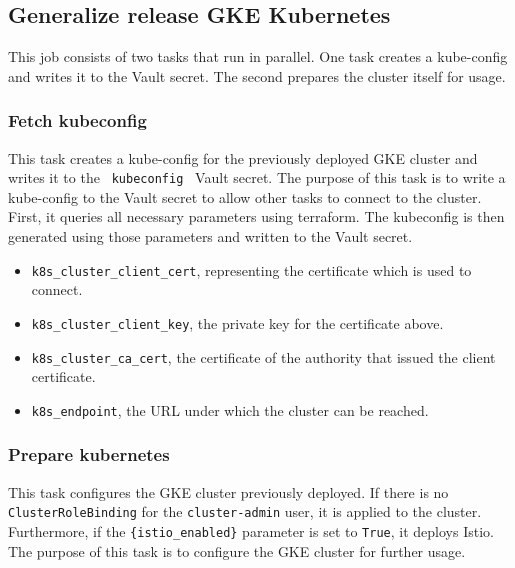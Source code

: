 \subsection{Generalize release GKE Kubernetes}\label{subsec:generalize-release-gke-kubernetes}

This job consists of two tasks that run in parallel.
One task creates a kube-config and writes it to the Vault secret.
The second prepares the cluster itself for usage.

\subsubsection{Fetch kubeconfig}\label{subsubsec:fetch-kubeconfig}

This task creates a kube-config for the previously deployed GKE cluster and writes it to the \verb| kubeconfig | Vault secret.
The purpose of this task is to write a kube-config to the Vault secret to allow other tasks to connect to the cluster.
First, it queries all necessary parameters using terraform.
The kubeconfig is then generated using those parameters and written to the Vault secret.

\begin{itemize}
    \item \verb|k8s_cluster_client_cert|, representing the certificate which is used to connect.
    \item \verb|k8s_cluster_client_key|, the private key for the certificate above.
    \item \verb|k8s_cluster_ca_cert|, the certificate of the authority that issued the client certificate.
    \item \verb|k8s_endpoint|, the URL under which the cluster can be reached.
\end{itemize}


\subsubsection{Prepare kubernetes}\label{subsubsec:prepare-kubernetes}

This task configures the GKE cluster previously deployed.
If there is no \verb|ClusterRoleBinding| for the \verb|cluster-admin| user, it is applied to the cluster.
Furthermore, if the \verb|{istio_enabled}| parameter is set to \verb|True|, it deploys Istio.
The purpose of this task is to configure the GKE cluster for further usage.
